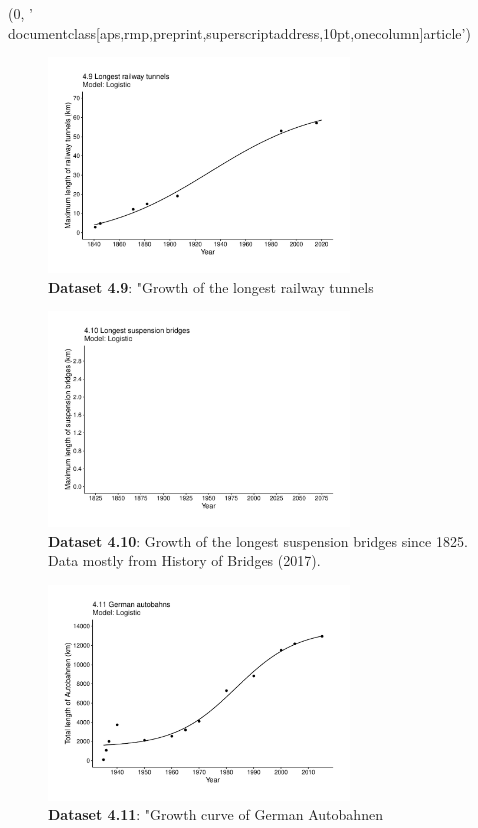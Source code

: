 (0, '\\documentclass[aps,rmp,preprint,superscriptaddress,10pt,onecolumn]{article}\n')
\begin{document}
\begin{figure}[h]
\includegraphics[width=8cm]{output/figs-ggplot/4.9.pdf}
\caption{\textbf{Dataset 4.9}: "Growth of the longest railway tunnels}
\end{figure}
	
\begin{figure}[h]
\includegraphics[width=8cm]{output/figs-ggplot/4.10.pdf}
\caption{\textbf{Dataset 4.10}: Growth of the longest suspension bridges since 1825. Data mostly from History of Bridges (2017).}
\end{figure}
	
\begin{figure}[h]
\includegraphics[width=8cm]{output/figs-ggplot/4.11.pdf}
\caption{\textbf{Dataset 4.11}: "Growth curve of German Autobahnen}
\end{figure}
	
\end{document}
